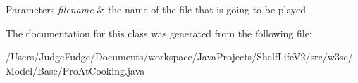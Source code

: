 \begin{DoxyParams}{Parameters}
{\em filename} & the name of the file that is going to be played \\
\hline
\end{DoxyParams}


The documentation for this class was generated from the following file\-:\begin{DoxyCompactItemize}
\item 
/\-Users/\-Judge\-Fudge/\-Documents/workspace/\-Java\-Projects/\-Shelf\-Life\-V2/src/w3se/\-Model/\-Base/Pro\-At\-Cooking.\-java\end{DoxyCompactItemize}
